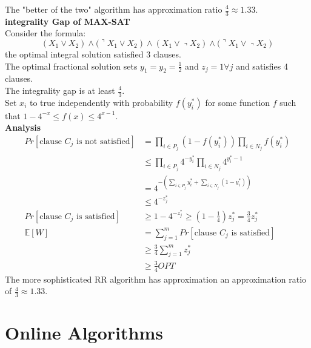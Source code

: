 \documentclass[onecolumn]{report}
\begin{document}
The "better of the two" algorithm has approximation ratio $\frac{4}{3}\approx 1.33$.\\
\textbf{integrality Gap of MAX-SAT}\\
Consider the formula:
\begin{equation*}
    \left.\left.\left.\left.\left(X_1 \vee X_2\right) \wedge(\urcorner X_1 \vee X_2\right) \wedge\left(X_1 \vee\right\urcorner X_2\right) \wedge(\urcorner X_1 \vee\right\urcorner X_2\right)
\end{equation*}
the optimal integral solution satisfied 3 clauses.\\
The optimal fractional solution sets $y_1=y_2=\frac{1}{2}$ and $z_j =1 \forall j$ and satisfies 4 clauses.\\
The integrality gap is at least $\frac{4}{3}$.\\
Set $x_i$ to true independently with probability $f(y_i^*)$ for some function $f$ such that $1-4^{-x} \leq f(x) \leq 4^{x-1}$.\\
\textbf{Analysis}\\
\begin{align*}
    Pr[\text{clause } C_j \text{ is not satisfied}] &= \prod_{i \in P_j}(1-f(y_i^*))\prod_{i \in N_j}f(y_i^*)\\
    &\leq \prod_{i \in P_j}4^{-y_i^*}\prod_{i \in N_j}4^{y_i^*-1}\\
    &= 4^{-\left(\sum_{i \in P_j}y_i^*+\sum_{i \in N_j}(1-y_i^*)\right)}\\
    &\leq 4^{-z_j^*}\\
    Pr[\text{clause } C_j \text{ is satisfied}] &\geq 1-4^{-z_j^*}\geq \left(1-\frac{1}{4}\right)z_j^* = \frac{3}{4}z_j^*\\
    \mathbb{E}[W] &= \sum_{j=1}^{m}Pr[\text{clause } C_j \text{ is satisfied}]\\
    &\geq \frac{3}{4}\sum_{j=1}^{m}z_j^*\\
    &\geq \frac{3}{4}OPT
\end{align*}
The more sophisticated RR algorithm has approximation an approximation ratio of $\frac{4}{3} \approx 1.33$.\\

\chapter{Online Algorithms}
\end{document}
